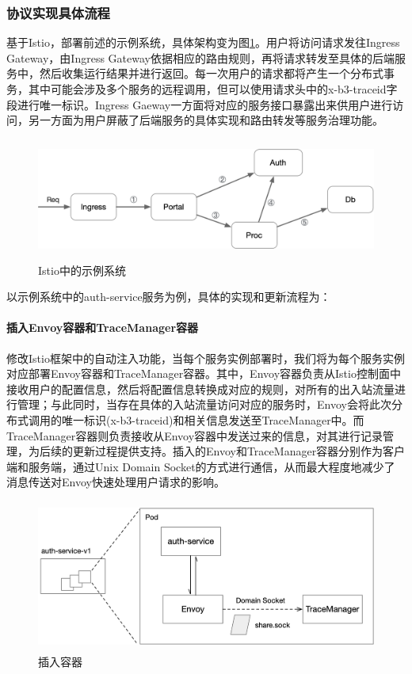 \documentclass[a4paper, 12pt]{article}
\theoremstyle{definition}
\begin{document}
\subsubsection{协议实现具体流程}
基于Istio，部署前述的示例系统，具体架构变为图\ref{fig:demo_arch_on_istio}。用户将访问请求发往Ingress Gateway，由Ingress Gateway依据相应的路由规则，再将请求转发至具体的后端服务中，然后收集运行结果并进行返回。每一次用户的请求都将产生一个分布式事务，其中可能会涉及多个服务的远程调用，但可以使用请求头中的x-b3-traceid字段进行唯一标识。Ingress Gaeway一方面将对应的服务接口暴露出来供用户进行访问，另一方面为用户屏蔽了后端服务的具体实现和路由转发等服务治理功能。

\begin{figure}[ht]
 \centering
 \includegraphics[height=4cm]{images/demo_arch_on_istio.png}
 \caption{Istio中的示例系统}
 \label{fig:demo_arch_on_istio}
\end{figure}

以示例系统中的auth-service服务为例，具体的实现和更新流程为：
\paragraph{插入Envoy容器和TraceManager容器}
修改Istio框架中的自动注入功能，当每个服务实例部署时，我们将为每个服务实例对应部署Envoy容器和TraceManager容器。其中，Envoy容器负责从Istio控制面中接收用户的配置信息，然后将配置信息转换成对应的规则，对所有的出入站流量进行管理；与此同时，当存在具体的入站流量访问对应的服务时，Envoy会将此次分布式调用的唯一标识(x-b3-traceid)和相关信息发送至TraceManager中。而TraceManager容器则负责接收从Envoy容器中发送过来的信息，对其进行记录管理，为后续的更新过程提供支持。插入的Envoy和TraceManager容器分别作为客户端和服务端，通过Unix Domain Socket的方式进行通信，从而最大程度地减少了消息传送对Envoy快速处理用户请求的影响。
\begin{figure}[ht]
 \centering
 \includegraphics[height=5cm]{images/insert_containers.png}
 \caption{插入容器}
 \label{fig:insert_containers}
\end{figure}
\end{document}
